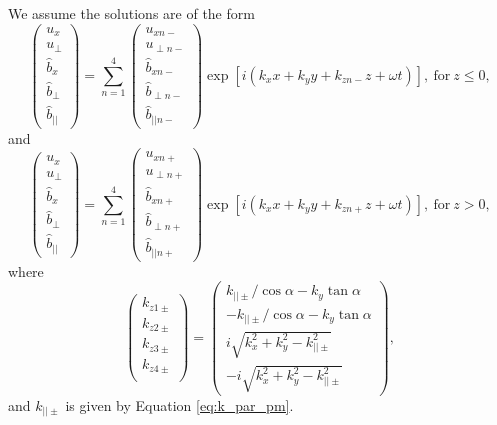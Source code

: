 We assume the solutions are of the form
\begin{equation}
    \label{eq:oblique_field_piecewise_constant_summation}
    \begin{pmatrix}
    u_x \\
    u_\perp \\
    \hat{b}_x \\
    \hat{b}_\perp \\
    \hat{b}_{||}
    \end{pmatrix}
    =
    \sum_{n=1}^{4} \begin{pmatrix}
    u_{xn-} \\
    u_{\perp n-} \\
    \hat{b}_{xn-} \\
    \hat{b}_{\perp n-} \\
    \hat{b}_{||n-}
    \end{pmatrix}
    \exp[i(k_x x + k_y y + k_{zn-}z + \omega t)],\ \text{for}\ z\le 0,
\end{equation}
and 
\begin{equation}
    \begin{pmatrix}
    u_x \\
    u_\perp \\
    \hat{b}_x \\
    \hat{b}_\perp \\
    \hat{b}_{||}
    \end{pmatrix}
    =
    \sum_{n=1}^{4} \begin{pmatrix}
    u_{xn+} \\
    u_{\perp n+} \\
    \hat{b}_{xn+} \\
    \hat{b}_{\perp n+} \\
    \hat{b}_{||n+}
    \end{pmatrix}
    \exp[i(k_x x + k_y y + k_{zn+}z + \omega t)],\ \text{for}\ z> 0,
\end{equation}
where
\begin{equation}
\begin{pmatrix}
k_{z1\pm} \\
k_{z2\pm} \\
k_{z3\pm} \\
k_{z4\pm} \\
\end{pmatrix}
=
\begin{pmatrix}
 k_{||\pm}/\cos\alpha - k_y\tan\alpha \\
-k_{||\pm}/\cos\alpha - k_y\tan\alpha \\
 i\sqrt{k_x^2+k_y^2 - k_{||\pm}^2} \\
-i\sqrt{k_x^2+k_y^2 - k_{||\pm}^2}
\end{pmatrix},
\end{equation}
and $k_{||\pm}$ is given by Equation \eqref{eq:k_par_pm}.

